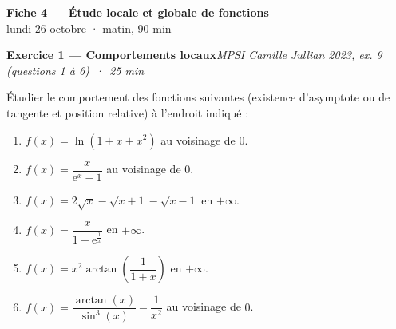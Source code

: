 \documentclass[11pt,a4paper]{article}
\newcommand{\ee}{\mathrm{e}}
\newcommand{\exo}[3]{\vspace{1.1em}\noindent\textbf{\large #1}\hfill\textit{#2 \,·\, #3}\par\smallskip}
\begin{document}
\begin{center}
{\LARGE\bfseries Fiche 4 — Étude locale et globale de fonctions}\\[0.3em]
{\large lundi 26 octobre · matin, 90 min}
\end{center}

\noindent{}


\exo{Exercice 1 — Comportements locaux}{MPSI Camille Jullian 2023, ex. 9 (questions 1 à 6)}{25 min}
\noindent Étudier le comportement des fonctions suivantes (existence d'asymptote ou de tangente et position relative) à l'endroit indiqué :
\begin{enumerate}[itemsep=0.4em]
\item $f(x)=\ln(1+x+x^2)$ au voisinage de $0$.
\item $f(x)=\dfrac{x}{\ee^x-1}$ au voisinage de $0$.
\item $f(x)=2\sqrt{x}-\sqrt{x+1}-\sqrt{x-1}$ en $+\infty$.
\item $f(x)=\dfrac{x}{1+\ee^{\frac1x}}$ en $+\infty$.
\item $f(x)=x^2\arctan\!\left(\dfrac{1}{1+x}\right)$ en $+\infty$.
\item $f(x)=\dfrac{\arctan(x)}{\sin^3(x)}-\dfrac{1}{x^2}$ au voisinage de $0$.
\end{enumerate}
\end{document}
